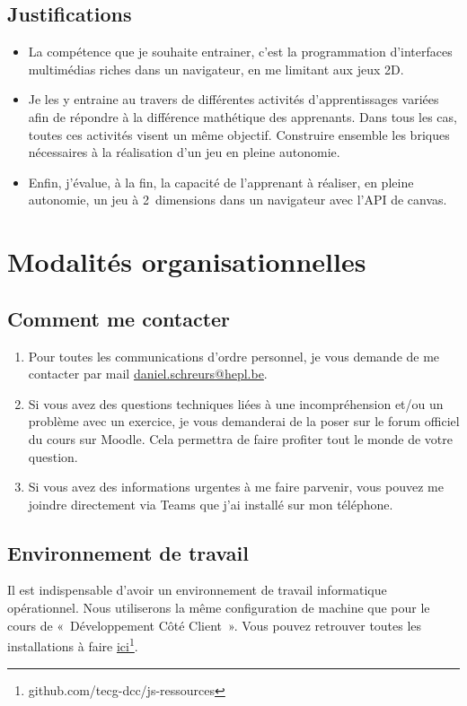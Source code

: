 \subsection{Justifications}
\begin{itemize}
    \item La compétence que je souhaite entrainer, c'est la programmation d'interfaces multimédias riches dans un navigateur, en me limitant aux jeux 2D.
    \item Je les y entraine au travers de différentes activités d'apprentissages variées afin de répondre à la différence mathétique des apprenants. Dans tous les cas, toutes ces activités visent un même objectif. Construire ensemble les briques nécessaires à la réalisation d'un jeu en pleine autonomie.
    \item Enfin, j'évalue, à la fin, la capacité de l'apprenant à réaliser, en pleine autonomie, un jeu à 2~dimensions dans un navigateur avec l'API de canvas.
\end{itemize}
\clearpage

\section{Modalités organisationnelles}
\subsection{Comment me contacter}
\begin{enumerate}
    \item Pour toutes les communications d'ordre personnel, je vous demande de me contacter par mail \href{mailto:daniel.schreurs@hepl.be}{daniel.schreurs@hepl.be}.
    \item Si vous avez des questions techniques liées à une incompréhension et/ou un problème avec un exercice, je vous demanderai de la poser sur le forum officiel du cours sur Moodle. Cela permettra de faire profiter tout le monde de votre question.
    \item Si vous avez des informations urgentes à me faire parvenir, vous pouvez me joindre directement via Teams que j'ai installé sur mon téléphone.
\end{enumerate}
\subsection{Environnement de travail}

Il est indispensable d'avoir un environnement de travail informatique opérationnel. Nous utiliserons la même configuration de machine que pour le cours de «~Développement Côté Client~». Vous pouvez retrouver toutes les installations à faire \href{https://github.com/tecg-dcc/js-ressources#environnement-de-travail}{ici}\footnote{github.com/tecg-dcc/js-ressources}.
\clearpage
\printbibliography


